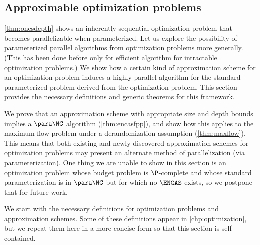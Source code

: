\subsection{Approximable optimization problems}

%
%
%
\autoref{thm:onesdepth} shows an inherently sequential optimization problem that becomes parallelizable when parameterized.
%
%
%
Let us explore the possibility of parameterized parallel algorithms from optimization problems more generally.
(This has been done before only for efficient algorithm for intractable optimization problems.)
%
%
%
We show how a certain kind of approximation scheme for an optimization problem induces a highly parallel algorithm for the standard parameterized problem derived from the optimization problem.
%
%
%
This section provides the necessary definitions and generic theorems for this framework.
%

%
%
%
We prove that an approximation scheme with appropriate size and depth bounds implies a $\para \NC$ algorithm (\autoref{thm:encasfpp}), and show how this applies to the maximum flow problem under a derandomization assumption (\autoref{thm:maxflow}).
%
%
%
This means that both existing and newly discovered approximation schemes for optimization problems may present an alternate method of parallelization (via parameterization).
%
%
One thing we are unable to show in this section is an optimization problem whose budget problem is $\P$-complete and whose standard parameterization is in $\para \NC$ but for which no $\ENCAS$ exists, so we postpone that for future work.


We start with the necessary definitions for optimization problems and approximation schemes.
Some of these definitions appear in \autoref{chp:optimization}, but we repeat them here in a more concise form so that this section is self-contained.

